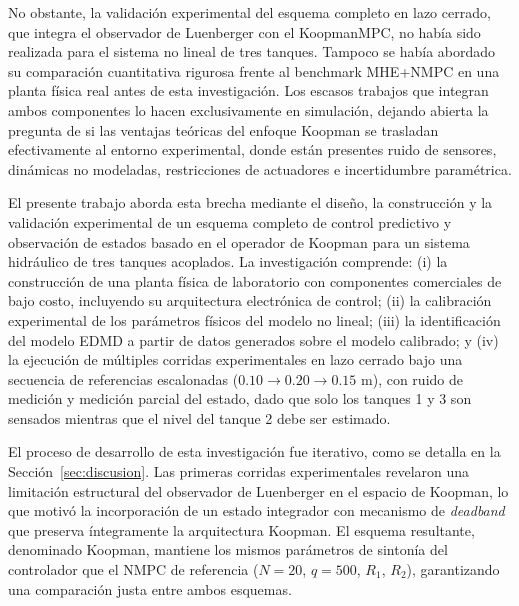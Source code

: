 \documentclass[12pt,letterpaper]{article}
\begin{document}
No obstante, la validación experimental del esquema completo en lazo cerrado, que
integra el observador de Luenberger con el KoopmanMPC, no había sido realizada para
el sistema no lineal de tres tanques. Tampoco se había abordado su comparación
cuantitativa rigurosa frente al benchmark MHE+NMPC en una planta física real antes
de esta investigación. Los escasos trabajos que integran ambos componentes lo hacen
exclusivamente en simulación, dejando abierta la pregunta de si las ventajas
teóricas del enfoque Koopman se trasladan efectivamente al entorno experimental,
donde están presentes ruido de sensores, dinámicas no modeladas, restricciones de
actuadores e incertidumbre paramétrica.

El presente trabajo aborda esta brecha mediante el diseño, la construcción y la
validación experimental de un esquema completo de control predictivo y observación
de estados basado en el operador de Koopman para un sistema hidráulico de tres
tanques acoplados. La investigación comprende: (i) la construcción de una planta
física de laboratorio con componentes comerciales de bajo costo, incluyendo su
arquitectura electrónica de control; (ii) la calibración experimental de los
parámetros físicos del modelo no lineal; (iii) la identificación del modelo EDMD a
partir de datos generados sobre el modelo calibrado; y (iv) la ejecución de múltiples
corridas experimentales en lazo cerrado bajo una secuencia de referencias escalonadas
($0.10 \rightarrow 0.20 \rightarrow 0.15$ m), con ruido de medición y medición
parcial del estado, dado que solo los tanques 1 y 3 son sensados mientras que el
nivel del tanque 2 debe ser estimado.

El proceso de desarrollo de esta investigación fue iterativo, como se detalla en la
Sección~\ref{sec:discusion}. Las primeras corridas experimentales revelaron una
limitación estructural del observador de Luenberger en el espacio de Koopman, lo que
motivó la incorporación de un estado integrador con mecanismo de \textit{deadband}
que preserva íntegramente la arquitectura Koopman. El esquema resultante, denominado
Koopman, mantiene los mismos parámetros de sintonía del controlador que el NMPC de
referencia ($N=20$, $q=500$, $R_1$, $R_2$), garantizando una comparación justa entre
ambos esquemas.
\end{document}
